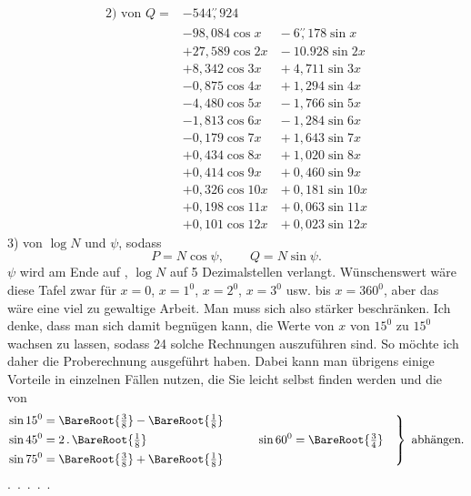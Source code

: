 \[
\begin{aligned}
\text{2) von }Q={}&-544\overset{\prime\prime}{,}924\\
&-98{,}084\cos x &{}-6\overset{\prime\prime}{,}178\sin x\\
&+27{,}589\cos2x &{}-10.928\sin2x\\
&+8{,}342\cos3x &{}+4{,}711\sin3x\\
&-0{,}875\cos4x &{}+1{,}294\sin4x\\
&-4{,}480\cos5x &{}-1{,}766\sin5x\\
&-1{,}813\cos6x &{}-1{,}284\sin6x\\
&-0{,}179\cos7x &{}+1{,}643\sin7x\\
&+0{,}434\cos8x &{}+1{,}020\sin8x\\
&+0{,}414\cos9x &{}+0{,}460\sin9x\\
&+0{,}326\cos10x &{}+0{,}181\sin10x\\
&+0{,}198\cos11x &{}+0{,}063\sin11x\\
&+0{,}101\cos12x &{}+0{,}023\sin12x
\end{aligned}
\]
\noindent\hspace*{\parindent}3) von \(\log N\) und \(\psi\), sodass
\[
P=N\cos\psi,\qquad Q=N\sin\psi.
\]
\noindent\(\psi\) wird am Ende auf , \(\log N\) auf 5 Dezimalstellen verlangt. Wünschenswert
wäre diese Tafel zwar für \(x=0\), \(x=1^0\), \(x=2^0\), \(x=3^0\) usw. bis
\(x=360^0\), aber das wäre eine viel zu gewaltige Arbeit. Man
muss sich also stärker beschränken. Ich denke, dass man sich  damit begnügen kann,
die Werte von \(x\) von \(15^0\) zu \(15^0\) wachsen zu lassen, sodass
24 solche Rechnungen auszuführen sind. So möchte ich daher die Proberechnung ausgeführt haben.
Dabei kann man übrigens einige Vorteile in einzelnen Fällen nutzen,
die Sie leicht selbst finden werden und die von
\[
\left.\begin{aligned}
\sin15^0&=\BareRoot{\tfrac{3}{8}}-\BareRoot{\tfrac{1}{8}}\\
\sin45^0&=2\,\mathord{.}\,\BareRoot{\tfrac{1}{8}}
&\qquad\sin60^0&=\BareRoot{\tfrac{3}{4}}\\
\sin75^0&=\BareRoot{\tfrac{3}{8}}+\BareRoot{\tfrac{1}{8}}
\end{aligned}\right\}\ \text{abhängen.}
\]
\noindent\hspace*{\parindent}.\ .\ .\ .\ .
\clearpage
\endgroup
